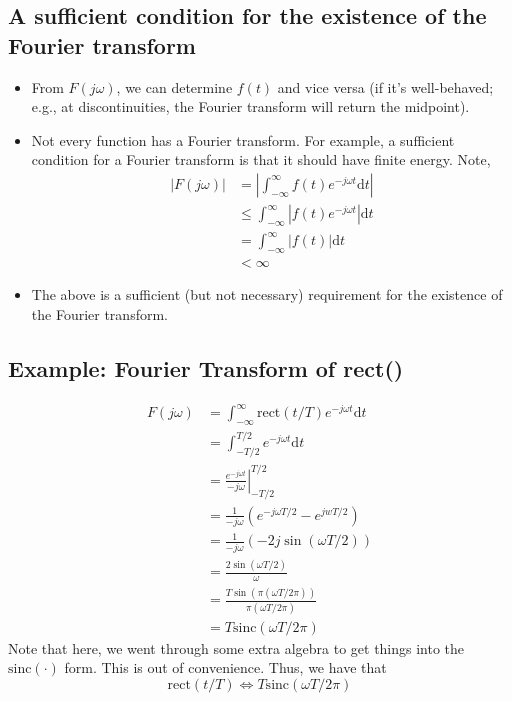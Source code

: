 \documentclass[10pt]{article}
\newcommand{\sinc}{\text{sinc}}
\begin{document}
\subsection*{A sufficient condition for the existence of the Fourier transform}
    \begin{itemize}
        \item From $F(j\omega)$, we can determine $f(t)$ and vice versa (if it's well-behaved; e.g., at discontinuities, the Fourier transform will return the midpoint).
        \item Not every function has a Fourier transform.  For example, a sufficient condition for a Fourier transform is that it should have finite energy.  Note,
        \begin{align*}
            |F(j\omega)| &= \left|\int_{-\infty}^\infty f(t) e^{-j\omega t} \text{d}t\right|\\
            &\leq \int_{-\infty}^\infty \left| f(t) e^{-j\omega t} \right| \text{d}t\\
            &= \int_{-\infty}^\infty|f(t)| \text{d}t\\
            &< \infty
        \end{align*}
        \item The above is a sufficient (but not necessary) requirement for the existence of the Fourier transform.
    \end{itemize}

\subsection*{Example: Fourier Transform of rect()}
\begin{align*}
    F(j\omega) &= \int_{-\infty}^\infty \text{rect}(t/T) e^{-j\omega t} \text{d}t\\
    &= \int_{-T/2}^{T/2} e^{-j\omega t} \text{d}t\\
    &= \left.\frac{e^{-j\omega t}}{-j\omega}\right|_{-T/2}^{T/2}\\
    &= \frac{1}{-j\omega} \left(e^{-j\omega T/2} - e^{jwT/2}\right)\\
    &= \frac{1}{-j\omega}(-2j \sin(\omega T/2))\\
    &= \frac{2\sin(\omega T/2)}{\omega}\\
    &= \frac{T \sin(\pi(\omega T/2\pi))}{\pi(\omega T/2\pi)}\\
    &= T \sinc(\omega T / 2\pi)
\end{align*}
Note that here, we went through some extra algebra to get things into the $\sinc(\cdot)$ form.  This is out of convenience.  Thus, we have that
\[\text{rect}(t/T) \Longleftrightarrow T \sinc(\omega T/2\pi)\]
\end{document}
